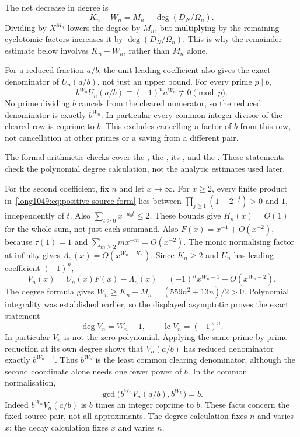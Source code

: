 \documentclass[11pt]{article}
\begin{document}
The net decrease in degree is
\[
 K_n-W_n=M_n-\deg(D_N/\Omega_n).
\]
Dividing by $X^{M_n}$ lowers the degree by $M_n$, but multiplying
by the remaining cyclotomic factors increases it by
$\deg(D_N/\Omega_n)$. This is why the remainder estimate below
involves $K_n-W_n$, rather than $M_n$ alone.

For a reduced fraction $a/b$, the unit leading coefficient also gives
the exact denominator of $U_n(a/b)$, not just an upper bound. For every prime $p\mid b$,
\[
 b^{W_n}U_n(a/b)\equiv(-1)^n a^{W_n}\not\equiv0\pmod p.
\]
No prime dividing $b$ cancels from the cleared numerator, so the
reduced denominator is exactly $b^{W_n}$. In particular every common
integer divisor of the cleared row is coprime to $b$. This excludes
cancelling a factor of $b$ from this row, not cancellation at other
primes or a saving from a different pair.

The formal arithmetic checks cover the
,
the
,
its
,
and the
.
These statements check the polynomial degree calculation, not the
analytic estimates used later.

For the second coefficient, fix $n$ and let $x\to\infty$. For $x\ge2$,
every finite product in~\eqref{long1049:eq:positive-source-form} lies
between $\prod_{j\ge1}(1-2^{-j})>0$ and $1$, independently of $t$.
Also $\sum_{t\ge0}x^{-a_0t}\le2$. These bounds give $H_n(x)=O(1)$
for the whole sum, not just each summand. Also
$F(x)=x^{-1}+O(x^{-2})$, because $\tau(1)=1$ and
$\sum_{m\ge2}m x^{-m}=O(x^{-2})$. The monic normalising factor at
infinity gives $\Lambda_n(x)=O(x^{W_n-K_n})$. Since $K_n\ge2$ and
$U_n$ has leading coefficient $(-1)^n$,
\[
 V_n(x)=U_n(x)F(x)-\Lambda_n(x)
       =(-1)^n x^{W_n-1}+O(x^{W_n-2}).
\]
The degree formula gives $W_n\ge K_n-M_n=(559n^2+13n)/2>0$.
Polynomial integrality was established earlier, so the displayed
asymptotic proves the exact statement
\begin{equation}\label{long1049:eq:V-degree}
 \deg V_n=W_n-1,\qquad \operatorname{lc}V_n=(-1)^n.
\end{equation}
In particular $V_n$ is not the zero polynomial. Applying the same
prime-by-prime reduction at its own degree shows that $V_n(a/b)$ has
reduced denominator exactly $b^{W_n-1}$. Thus $b^{W_n}$ is the least
common clearing denominator, although the second coordinate alone
needs one fewer power of $b$. In the common normalisation,
\[
 \gcd\!\bigl(b^{W_n}V_n(a/b),b^{W_n}\bigr)=b.
\]
Indeed $b^{W_n}V_n(a/b)$ is $b$ times an integer coprime to $b$.
These facts concern the fixed source pair, not all approximants.
The degree calculation fixes $n$ and varies $x$; the decay calculation
fixes $x$ and varies $n$.
\end{document}
